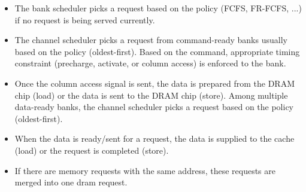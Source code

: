 \begin{itemize}
  \item The bank scheduler picks a request based on the policy (FCFS,
    FR-FCFS, ...) if no request is being served currently.

  \item The channel scheduler picks a request from command-ready banks
    usually based on the policy (oldest-first). Based on the command,
    appropriate timing constraint (precharge, activate, or column
    access) is enforced to the bank.

  \item Once the column access signal is sent, the data is prepared
  from the DRAM chip (load) or the data is sent to the DRAM chip
  (store). Among multiple data-ready banks, the channel scheduler
  picks a request based on the policy (oldest-first).

  \item When the data is ready/sent for a request, the data is
  supplied to the cache (load) or the request is completed (store).

  \item If there are memory requests with the same address, these
  requests are merged into one dram request. 

\end{itemize}



